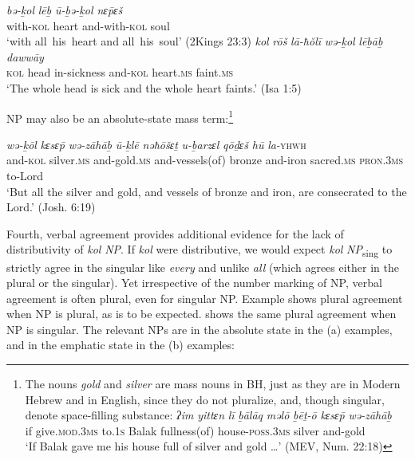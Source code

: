 \documentclass[output=paper]{langsci/langscibook}
\begin{document}
\ea%
    \label{ex:doron:17}
    \ea
    \gll \textit{bə-ḵol}       \textit{lēḇ}      \textit{ū-ḇə{}-ḵol           nɛ\={p}ɛš} \\
         with-\textsc{kol} heart  and-with-\textsc{kol}  soul        \\
    \glt `with all~his~heart and all~his~soul' (2Kings 23:3)
    \ex
    \gll \textit{kol}    \textit{rōš}     \textit{lā-ħŏlī}        \textit{wə-ḵol}     \textit{lēḇāḇ}        \textit{dawwāy}\\
         \textsc{kol} head  in-sickness  and-\textsc{kol} heart.\textsc{ms}  faint.\textsc{ms}\\
    \glt `The whole head is sick and the whole heart faints.' (Isa 1:5)
    \z
\z

NP may also be an absolute-state mass term:\footnote{The nouns \textit{gold} and \textit{silver} are mass nouns in BH, just as they are in Modern Hebrew and in English, since they do not pluralize, and, though singular, denote space-filling substance:
\ea
    \gll \textit{ʔim} \textit{yittɛn}                \textit{lī}      \textit{ḇālāq} \textit{məlō}             \textit{ḇēṯ-ō}                    \textit{kɛsɛ}\textrm{\textit{\={p}}} \textit{wə-zāhāḇ}\\
            if    give.\textsc{mod.3ms} to.\textsc{1s} Balak fullness(of)  house-\textrm{\textsc{poss.3ms}}  silver and-gold \\
    \glt `If Balak gave me his house full of silver and gold …' (MEV, Num. 22:18)
\z}

\ea%
    \label{ex:doron:18}
    \gll \textit{wə-ḵōl} \textit{kɛsɛ\={p}} \textit{wə-zāhāḇ} \textit{ū{}-ḵlē}   \textit{nəħōšɛṯ}  \textit{u-ḇarzɛl}   \textit{qōḏɛš}  \textit{hū}      \textit{la-}\textsc{yhwh}\\
         and-\textsc{kol} silver.\textsc{ms} and-gold.\textsc{ms}  and-vessels(of)  bronze   and-iron  sacred.\textsc{ms}  \textsc{pron.3ms}  to-Lord\\
    \glt `But all the silver and gold, and vessels of bronze and iron, are consecrated to the Lord.' (Josh. 6:19)
    \z

Fourth, verbal agreement provides additional evidence for the lack of distributivity of \textit{kol} \textit{NP}. If \textit{kol} were distributive, we would expect \textit{kol} \textit{NP}\textsubscript{sing} to strictly agree in the singular like \textit{every} and unlike \textit{all} (which agrees either in the plural or the singular). Yet irrespective of the number marking of NP, verbal agreement is often plural, even for singular NP. Example  shows plural agreement when NP is plural, as is to be expected.  shows the same plural agreement when NP is singular. The relevant NPs are in the absolute state in the (a) examples, and in the emphatic state in the (b) examples:
\end{document}
